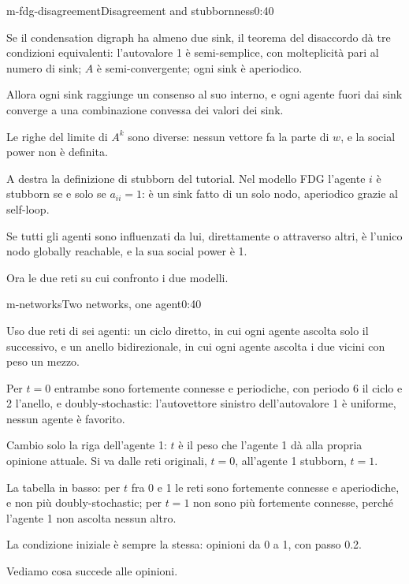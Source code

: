 \begin{slide}{m-fdg-disagreement}{Disagreement and stubbornness}{0:40}
  \begin{discorso}
    \item Se il condensation digraph ha almeno due sink, il teorema del disaccordo dà tre condizioni equivalenti: l'autovalore 1 è semi-semplice, con molteplicità pari al numero di sink; $A$ è semi-convergente; ogni sink è aperiodico.
    \item Allora ogni sink raggiunge un consenso al suo interno, e ogni agente fuori dai sink converge a una combinazione convessa dei valori dei sink.
    \item Le righe del limite di $A^k$ sono diverse: nessun vettore fa la parte di $w$, e la social power non è definita.
    \item A destra la definizione di stubborn del tutorial. Nel modello FDG l'agente $i$ è stubborn se e solo se $a_{ii}=1$: è un sink fatto di un solo nodo, aperiodico grazie al self-loop.
    \item Se tutti gli agenti sono influenzati da lui, direttamente o attraverso altri, è l'unico nodo globally reachable, e la sua social power è 1.
    \item Ora le due reti su cui confronto i due modelli.
  \end{discorso}
\end{slide}

\begin{slide}{m-networks}{Two networks, one agent}{0:40}
  \begin{discorso}
    \item Uso due reti di sei agenti: un ciclo diretto, in cui ogni agente ascolta solo il successivo, e un anello bidirezionale, in cui ogni agente ascolta i due vicini con peso un mezzo.
    \item Per $t=0$ entrambe sono fortemente connesse e periodiche, con periodo 6 il ciclo e 2 l'anello, e doubly-stochastic: l'autovettore sinistro dell'autovalore 1 è uniforme, nessun agente è favorito.
    \item Cambio solo la riga dell'agente 1: $t$ è il peso che l'agente 1 dà alla propria opinione attuale. Si va dalle reti originali, $t=0$, all'agente 1 stubborn, $t=1$.
    \item La tabella in basso: per $t$ fra 0 e 1 le reti sono fortemente connesse e aperiodiche, e non più doubly-stochastic; per $t=1$ non sono più fortemente connesse, perché l'agente 1 non ascolta nessun altro.
    \item La condizione iniziale è sempre la stessa: opinioni da 0 a 1, con passo 0.2.
    \item Vediamo cosa succede alle opinioni.
  \end{discorso}
\end{slide}

